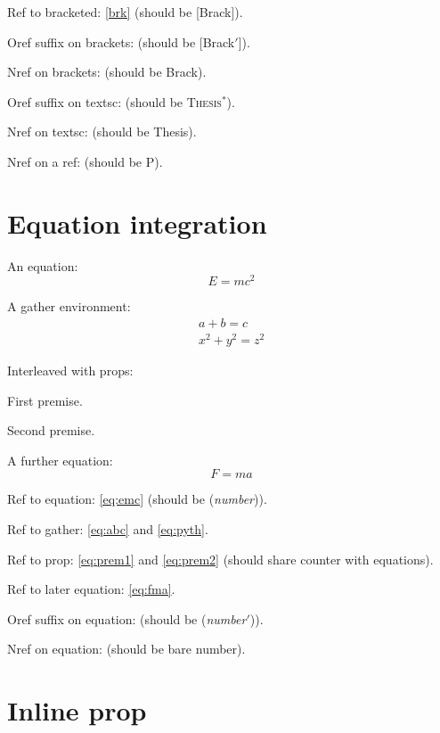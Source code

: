 \documentclass[leqno]{article}
\begin{document}
Ref to bracketed: \ref{brk} (should be [Brack]).

Oref suffix on brackets:  (should be [Brack$'$]).

Nref on brackets:  (should be Brack).

Oref suffix on textsc:  (should be \textsc{Thesis}$^*$).

Nref on textsc:  (should be Thesis).

Nref on a ref:  (should be P).

\section{Equation integration}

An equation:
\begin{equation}
  E = mc^2 \label{eq:emc}
\end{equation}

A gather environment:
\begin{gather}
  a + b = c \label{eq:abc} \\
  x^2 + y^2 = z^2 \label{eq:pyth}
\end{gather}

Interleaved with props:
\begin{prop}
  \item First premise. \label{eq:prem1}
  \item Second premise. \label{eq:prem2}
\end{prop}

A further equation:
\begin{equation}
  F = ma \label{eq:fma}
\end{equation}

Ref to equation: \ref{eq:emc} (should be (\textit{number})).

Ref to gather: \ref{eq:abc} and \ref{eq:pyth}.

Ref to prop: \ref{eq:prem1} and \ref{eq:prem2} (should share counter with equations).

Ref to later equation: \ref{eq:fma}.

Oref suffix on equation:  (should be (\textit{number}$'$)).

Nref on equation:  (should be bare number).

\section{Inline prop}
\end{document}

